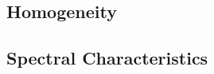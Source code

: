 

%		

%

	\subsection{Homogeneity}
	\label{sec:ExcitationEvaluation-Comparison-Homogeneity}

	\subsection{Spectral Characteristics}
	\label{sec:ExcitationEvaluation-Comparison-SpectralCharacteristics}

